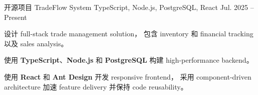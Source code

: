 \begin{cventries}
  \cventry
  {开源项目}
  {TradeFlow System}
  {TypeScript, Node.js, PostgreSQL, React}
  {Jul. 2025 -- Present}
  {
    \begin{cvitems}
      \item
            {
                  设计 full-stack trade management solution，
                  包含 inventory 和 financial tracking 以及 sales analysis。
            }
      \item
            {
                  使用 \textbf{TypeScript}、\textbf{Node.js} 和 \textbf{PostgreSQL} 构建 high-performance backend。
            }
      \item
            {
                  使用 \textbf{React} 和 \textbf{Ant Design} 开发 responsive frontend，
                  采用 component-driven architecture 加速 feature delivery 并保持 code reusability。
            }
    \end{cvitems}
  }
\end{cventries}
